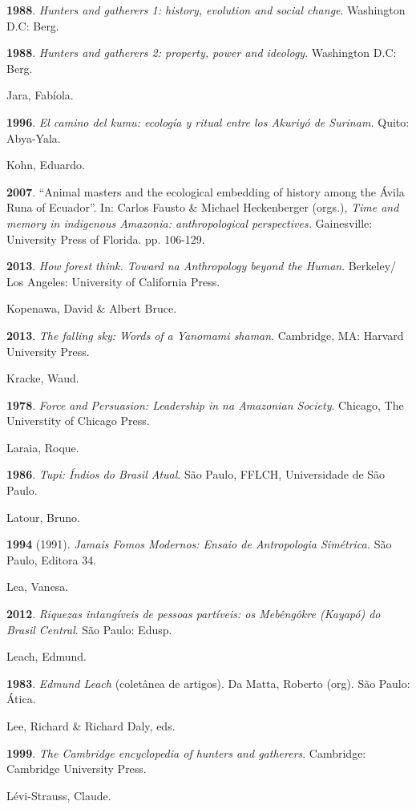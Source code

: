 \textbf{1988}. \emph{Hunters and gatherers 1: history, evolution and
social change}. Washington D.C: Berg.

\textbf{1988}. \emph{Hunters and gatherers 2: property, power and
ideology}. Washington D.C: Berg.

Jara, Fabíola.

\textbf{1996}. \emph{El camino del kumu: ecología y ritual entre los
Akuriyó de Surinam.} Quito: Abya-Yala.

Kohn, Eduardo.

\textbf{2007}. ``Animal masters and the ecological embedding of history
among the Ávila Runa of Ecuador''. In: Carlos Fausto \& Michael
Heckenberger (orgs.), \emph{Time and memory in indigenous Amazonia:
anthropological perspectives.} Gainesville: University Press of Florida.
pp. 106-129.

\textbf{2013}. \emph{How forest think. Toward na Anthropology beyond the
Human}. Berkeley/ Los Angeles: University of California Press.

Kopenawa, David \& Albert Bruce.

\textbf{2013}. \emph{The falling sky: Words of a Yanomami shaman}.
Cambridge, MA: Harvard University Press.

Kracke, Waud.

\textbf{1978}. \emph{Force and Persuasion: Leadership in na Amazonian
Society}. Chicago, The Universtity of Chicago Press.

Laraia, Roque.

\textbf{1986}. \emph{Tupi: Índios do Brasil Atual}. São Paulo, FFLCH,
Universidade de São Paulo.

Latour, Bruno.

\textbf{1994} (1991). \emph{Jamais Fomos Modernos: Ensaio de
Antropologia Simétrica.} São Paulo, Editora 34.

Lea, Vanesa.

\textbf{2012}. \emph{Riquezas intangíveis de pessoas partíveis: os
Mebêngôkre (Kayapó) do Brasil Central}. São Paulo: Edusp.

Leach, Edmund.

\textbf{1983}. \emph{Edmund Leach} (coletânea de artigos). Da Matta,
Roberto (org). São Paulo: Ática.

Lee, Richard \& Richard Daly, eds.

\textbf{1999}. \emph{The Cambridge encyclopedia of hunters and
gatherers}. Cambridge: Cambridge University Press.

Lévi-Strauss, Claude.

